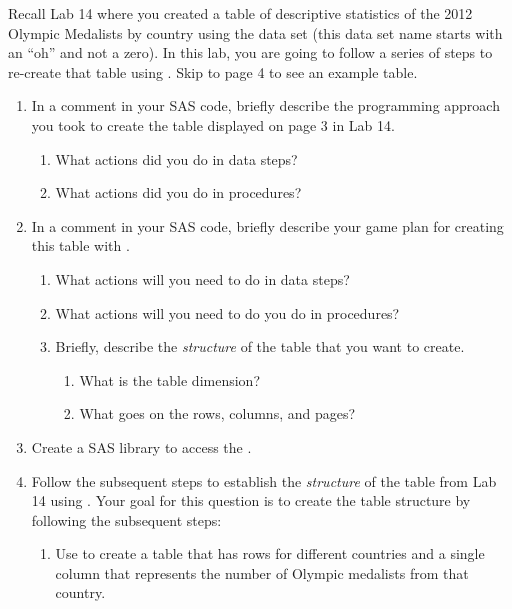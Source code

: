 



\vskip10pt

\noindent Recall Lab 14 where you created a table of descriptive statistics of the 2012 Olympic Medalists by country using the  data set (this data set name starts with an ``oh'' and not a zero).  In this lab, you are going to follow a series of steps to re-create that table using .  Skip to page 4 to see an example table.
 \begin{enumerate}
\item In a comment in your SAS code, briefly describe the programming approach you took to create the table displayed on page 3 in Lab 14.
\begin{enumerate}
\item What actions did you do in data steps?
\item What actions did you do in procedures?
\end{enumerate}
\item In a comment in your SAS code, briefly describe your game plan for creating this table with .
\begin{enumerate}
\item What actions will you need to do in data steps?
\item What actions will you need to do you do in procedures?
\item Briefly, describe the \emph{structure} of the table that you want to create.
\begin{enumerate}
\item What is the table dimension?
\item What goes on the rows, columns, and pages?
\end{enumerate}
\end{enumerate}
\item Create a SAS library to access the .
\item Follow the subsequent steps to establish the \emph{structure} of the table from Lab 14 using .  Your goal for this question is to create the table structure by following the subsequent steps:
\begin{enumerate}
\item Use  to create a table that has rows for different countries and a single column that represents the number of Olympic medalists from that country.

\end{enumerate}
\end{enumerate}
